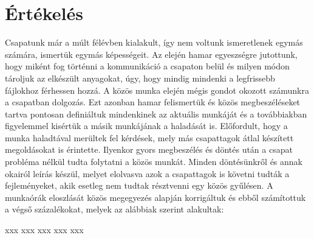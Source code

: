 \section{Értékelés}

Csapatunk már a múlt félévben kialakult, így nem voltunk ismeretlenek egymás számára, ismertük egymás képességeit. Az elején hamar egyeszségre jutottunk, hogy miként fog történni a kommunikáció a csapaton belül és milyen módon tároljuk az elkészült anyagokat, úgy, hogy mindig mindenki a legfrissebb fájlokhoz férhessen hozzá. 
A közös munka elején mégis gondot okozott számunkra a csapatban dolgozás. Ezt azonban hamar felismertük és közös megbeszéléseket tartva pontosan definiáltuk mindenkinek az aktuális munkáját és a továbbiakban figyelemmel kisértük a másik munkájának a haladását is. Előfordult, hogy a munka haladtával merültek fel kérdések, mely más csapattagok átlal készített megoldásokat is érintette. Ilyenkor gyors megbeszélés és döntés után a csapat probléma nélkül tudta folytatni a közös munkát. Minden döntésünkről és annak okairól leírás készül, melyet elolvasva azok a csapattagok is követni tudták a fejleményeket, akik esetleg nem tudtak résztvenni egy közös gyűlésen.
A munkaórák eloszlását közös megegyezés alapján korrigáltuk és ebből számítottuk a végső százalékokat, melyek az alábbiak szerint alakultak:

\begin{ertekeles}
{xxx}        %
{xxx}
{xxx}
{xxx}
{xxx}
\end{ertekeles}

